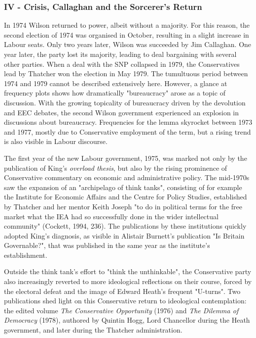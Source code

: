 \documentclass[
]{article}
\begin{document}
\hypertarget{header-n59}{%
\subsubsection{IV - Crisis, Callaghan and the Sorcerer's
Return}\label{header-n59}}

In 1974 Wilson returned to power, albeit without a majority. For this
reason, the second election of 1974 was organised in October, resulting
in a slight increase in Labour seats. Only two years later, Wilson was
succeeded by Jim Callaghan. One year later, the party lost its majority,
leading to deal bargaining with several other parties. When a deal with
the SNP collapsed in 1979, the Conservatives lead by Thatcher won the
election in May 1979. The tumultuous period between 1974 and 1979 cannot
be described extensively here. However, a glance at frequency plots
shows how dramatically "bureaucracy" arose as a topic of discussion.
With the growing topicality of bureaucracy driven by the devolution and
EEC debates, the second Wilson government experienced an explosion in
discussions about bureaucracy. Frequencies for the lemma skyrocket
between 1973 and 1977, mostly due to Conservative employment of the
term, but a rising trend is also visible in Labour discourse.

The first year of the new Labour government, 1975, was marked not only
by the publication of King's \emph{overload thesis}, but also by the
rising prominence of Conservative commentary on economic and
administrative policy. The mid-1970s saw the expansion of an
"archipelago of think tanks", consisting of for example the Institute
for Economic Affairs and the Centre for Policy Studies, established by
Thatcher and her mentor Keith Joseph "to do in political terms for the
free market what the IEA had so successfully done in the wider
intellectual community" (Cockett, 1994, 236). The publications by these
institutions quickly adopted King's diagnosis, as visible in Alistair
Burnett's publication "Is Britain Governable?", that was published in
the same year as the institute's establishment.

Outside the think tank's effort to "think the unthinkable", the
Conservative party also increasingly reverted to more ideological
reflections on their course, forced by the electoral defeat and the
image of Edward Heath's frequent "U-turns". Two publications shed light
on this Conservative return to ideological contemplation: the edited
volume \emph{The Conservative Opportunity} (1976) and \emph{The Dilemma
of Democracy} (1978), authored by Quintin Hogg, Lord Chancellor during
the Heath government, and later during the Thatcher administration.
\end{document}
